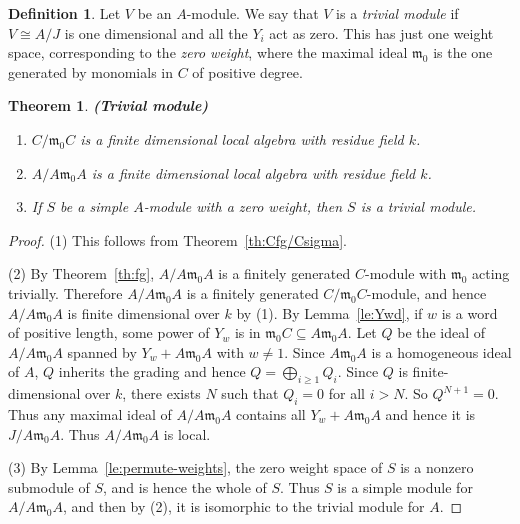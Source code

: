 \documentclass[12pt]{amsart}
\renewcommand{\ge}{\geqslant}
\newcommand{\mfm}{\mathfrak{m}}
\numberwithin{equation}{section}
\newtheorem{theorem}[equation]{Theorem}
\theoremstyle{definition}
\newtheorem{definition}[equation]{Definition}
\begin{document}
\begin{definition}
Let $V$ be an $A$-module. We say that $V$ is a \emph{trivial module}
if $V\cong A/J$ is one dimensional and all the $Y_i$ act as zero. This 
has just one weight space, corresponding to the \emph{zero weight}, 
where the maximal ideal $\mfm_0$ is the one generated by monomials in 
$C$ of positive degree. 
\end{definition}

\begin{theorem}{\bf (Trivial module)}\label{th:trivial}
\begin{enumerate}
\item 
$C/\mfm_0C$ is a finite dimensional local algebra with residue field $k$. 
\item
$A/A\mfm_0A$ is a finite dimensional local algebra with residue field $k$.
\item
If $S$ be a simple $A$-module with a zero 
weight, then $S$ is a trivial module.
\end{enumerate}
\end{theorem}
\begin{proof}
(1) This follows from Theorem~\ref{th:Cfg/Csigma}.

(2) By Theorem~\ref{th:fg}, $A/A\mfm_0A$ is a finitely generated
$C$-module with $\mfm_0$ acting trivially. Therefore $A/A\mfm_0A$ is a
finitely generated $C/\mfm_0C$-module, and hence $A/A\mfm_0A$ is
finite dimensional over $k$ by (1). 
By Lemma~\ref{le:Ywd}, if $w$ is a word of positive length, some power
of $Y_w$ is in $\mfm_0C\subseteq A\mfm_0A$. Let $Q$ be the ideal of $A/A\mfm_0A$ spanned by $Y_w+A\mfm_0A$ with $w\neq 1$. Since $A\mfm_0A$ is a homogeneous ideal of $A$, $Q$ inherits the grading and hence $Q=\bigoplus_{i\ge 1} Q_i$. Since $Q$ is finite-dimensional over $k$, there exists $N$ such that  $Q_i=0$ for all $i>N$. So $Q^{N+1}=0$. Thus any maximal ideal of
$A/A\mfm_0A$ contains all $Y_w+A\mfm_0A$ and hence it is
$J/A\mfm_0A$. Thus $A/A\mfm_0A$ is local.

(3) By Lemma~\ref{le:permute-weights}, the zero weight space 
of $S$ is a nonzero submodule of $S$, and is hence the whole of $S$. Thus
$S$ is a simple module for $A/A\mfm_0A$, and then by (2), it is 
isomorphic to the trivial module for $A$.
\end{proof}
\end{document}
